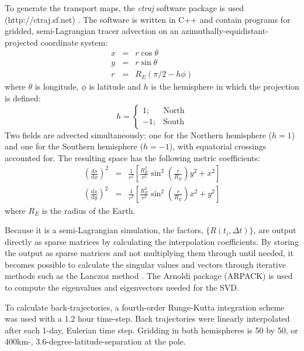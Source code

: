 To generate the transport maps, the \textit{ctraj} software package is used (http://ctraj.sf.net) \citep{Mills2009}.  
The software is written in C++ and contain programs
for gridded, semi-Lagrangian tracer advection on an 
azimuthally-equidistant-projected coordinate system:
\begin{eqnarray}
  x & = & r \cos \theta \\\nonumber
  y & = & r \sin \theta \\\nonumber
	r & = & R_E (\pi/2 - h \phi)
\end{eqnarray}
where $\theta$ is longitude, $\phi$ is latitude
and $h$ is the hemisphere in which the projection is
defined:
\begin{equation}
h = \left \lbrace \begin{array}{rl} 1; & \mathrm{North} \\ -1; & \mathrm{South} \end{array} \right .
\end{equation}
Two fields are advected simultaneously: one for the Northern hemisphere ($h=1$)
and one for the Southern hemisphere ($h=-1$), with equatorial crossings accounted for.
The resulting space has the following metric coefficients:
\begin{eqnarray}
\left (\frac{\mathrm ds}{\mathrm d x} \right )^2 & = & \frac{1}{r^2} \left [
	\frac{R_E^2}{r^2} \sin^2 \left (\frac{r}{R_E} \right ) 
	y^2 + x^2 \right ] \\ \nonumber
\left (\frac{\mathrm ds}{\mathrm d y} \right )^2 & = & \frac{1}{r^2} \left [
	\frac{R_E^2}{r^2} \sin^2 \left (\frac{r}{R_E} \right )
	x^2 + y^2 \right ]
	\label{metric_coef}
\end{eqnarray}
where $R_E$ is the radius of the Earth.

Because it is a semi-Lagrangian simulation, the factors, $\lbrace R(t_i,\Delta t) \rbrace$,
are output directly as sparse matrices by calculating the interpolation coefficients.
By storing the output as sparse matrices and not multiplying them through until
needed, it becomes possible to calculate the singular values and vectors through iterative
methods such as the Lanczoz method \citep{Golub_Van_Loan1996}.
The Arnoldi package (ARPACK) \citep{Lehoucq_Scott1996} is used to compute the
eigenvalues and eigenvectors needed for the SVD.

To calculate back-trajectories, a fourth-order Runge-Kutta integration scheme
was used with a 1.2 hour time-step.
Back trajectories were linearly interpolated after each 1-day, Eulerian time step.
Gridding in both hemispheres is 50 by 50, or 400km-,
3.6-degree-latitude-separation at the pole.

